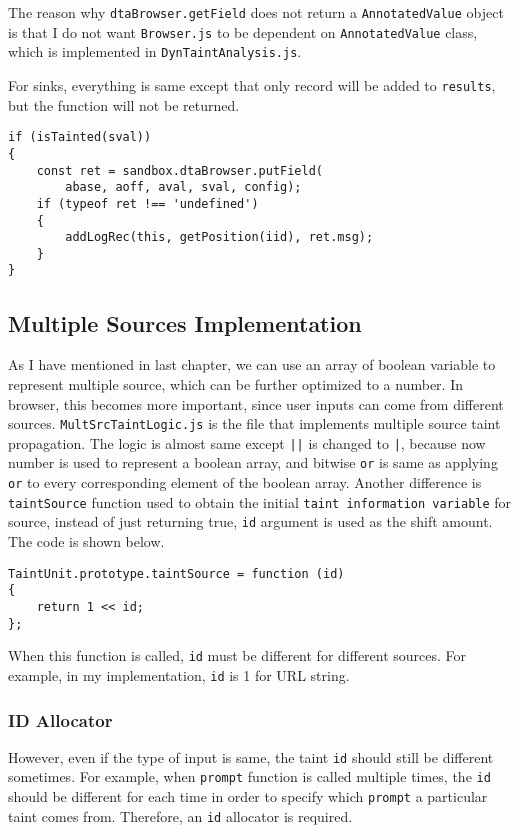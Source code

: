 The reason why \texttt{dtaBrowser.getField} does not return a \texttt{AnnotatedValue} object is that I do not want \texttt{Browser.js} to be dependent on \texttt{AnnotatedValue} class, which is implemented in \texttt{DynTaintAnalysis.js}.

For sinks, everything is same except that only record will be added to \texttt{results}, but the function will not be returned.

\begin{verbatim}
if (isTainted(sval))
{
	const ret = sandbox.dtaBrowser.putField(
		abase, aoff, aval, sval, config);
	if (typeof ret !== 'undefined')
	{
		addLogRec(this, getPosition(iid), ret.msg);
	}
}
\end{verbatim}



\subsection{Multiple Sources Implementation}

As I have mentioned in last chapter, we can use an array of boolean variable to represent multiple source, which can be further optimized to a number. In browser, this becomes more important, since user inputs can come from different sources. \texttt{MultSrcTaintLogic.js} is the file that implements multiple source taint propagation. The logic is almost same except \texttt{||} is changed to \texttt{|}, because now number is used to represent a boolean array, and bitwise \texttt{or} is same as applying \texttt{or} to every corresponding element of the boolean array. Another difference is \texttt{taintSource} function used to obtain the initial \texttt{taint information variable} for source, instead of just returning true, \texttt{id} argument is used as the shift amount. The code is shown below.

\begin{verbatim}
TaintUnit.prototype.taintSource = function (id)
{
	return 1 << id;
};
\end{verbatim}

 When this function is called, \texttt{id} must be different for different sources. For example, in my implementation, \texttt{id} is 1 for URL string.

\subsubsection{ID Allocator}

However, even if the type of input is same, the taint \texttt{id} should still be different sometimes. For example, when \texttt{prompt} function is called multiple times, the \texttt{id} should be different for each time in order to specify which \texttt{prompt} a particular taint comes from. Therefore, an \texttt{id} allocator is required. 

